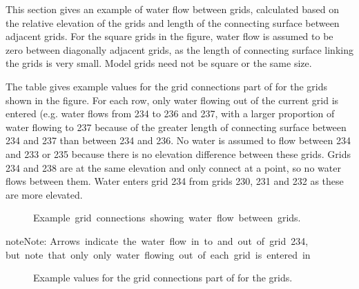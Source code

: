 \documentclass[letterpaper,10pt,english]{sphinxmanual}
\begin{document}
This section gives an example of water flow between grids, calculated
based on the relative elevation of the grids and length of the
connecting surface between adjacent grids. For the square grids in the
figure, water flow is assumed to be zero between diagonally adjacent
grids, as the length of connecting surface linking the grids is very
small. Model grids need not be square or the same size.

The table gives example values for the grid connections part of
{\hyperref[\detokenize{input_files/SUEWS_SiteInfo/SUEWS_SiteSelect:suews-siteselect-txt}]{}} for the grids shown in
the figure. For each row, only water flowing out of the current grid is
entered (e.g. water flows from 234 to 236 and 237, with a larger
proportion of water flowing to 237 because of the greater length of
connecting surface between 234 and 237 than between 234 and 236. No
water is assumed to flow between 234 and 233 or 235 because there is no
elevation difference between these grids. Grids 234 and 238 are at the
same elevation and only connect at a point, so no water flows between
them. Water enters grid 234 from grids 230, 231 and 232 as these are
more elevated.

\begin{figure}[htbp]
\centering
\capstart

\noindent{}
\caption{Example grid connections showing water flow between grids.}\label{\detokenize{input_files/SUEWS_SiteInfo/SUEWS_SiteSelect:id2}}\end{figure}

\begin{sphinxadmonition}{note}{Note:}
Arrows indicate the water flow in to and out of grid 234,
but note that only only water flowing out of each grid is entered in {\hyperref[\detokenize{input_files/SUEWS_SiteInfo/SUEWS_SiteSelect:suews-siteselect-txt}]{}}
\end{sphinxadmonition}

\begin{figure}[htbp]
\centering
\capstart

\noindent{}
\caption{Example values for the grid connections part of {\hyperref[\detokenize{input_files/SUEWS_SiteInfo/SUEWS_SiteSelect:suews-siteselect-txt}]{}} for the grids.}\label{\detokenize{input_files/SUEWS_SiteInfo/SUEWS_SiteSelect:id3}}\end{figure}
\end{document}
